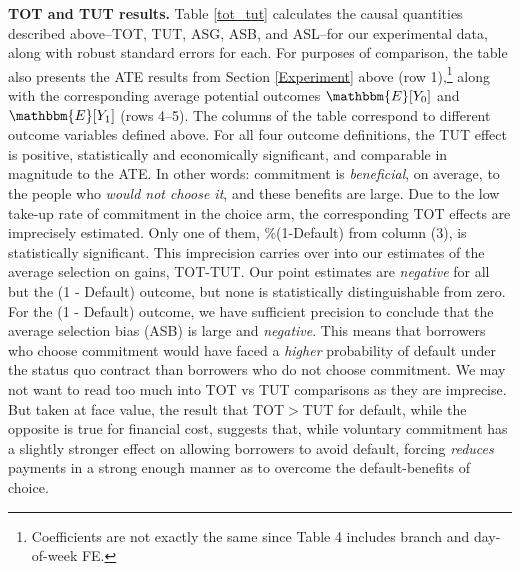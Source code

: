 \documentclass[11pt, a4paper]{article}
\begin{document}
\vspace{.2in}
\noindent \textbf{TOT and TUT results.} Table \ref{tot_tut} calculates the causal quantities described above--TOT, TUT, ASG, ASB, and ASL--for our experimental data, along with robust standard errors for each. 
For purposes of comparison, the table also presents the ATE results from Section \ref{Experiment} above (row 1),\footnote{Coefficients are not exactly the same since Table 4 includes branch and day-of-week FE.} along with the corresponding average potential outcomes $\mathbbm{E}[Y_0]$ and $\mathbbm{E}[Y_1]$ (rows 4--5).
The columns of the table correspond to different outcome variables defined above.
For all four outcome definitions, the TUT effect is positive, statistically and economically significant, and comparable in magnitude to the ATE.
In other words: commitment is \emph{beneficial}, on average, to the people who \emph{would not choose it}, and these benefits are large.
Due to the low take-up rate of commitment in the choice arm, the corresponding TOT effects are imprecisely estimated. Only one of them, \%(1-Default) from column (3), is statistically significant. 
This imprecision carries over into our estimates of the average selection on gains, TOT-TUT. Our point estimates are \emph{negative} for all but the (1 - Default) outcome, but none is statistically distinguishable from zero.  
For the (1 - Default) outcome, we have sufficient precision to conclude that the average selection bias (ASB) is large and \emph{negative}.
This means that borrowers who choose commitment would have faced a \emph{higher} probability of default under the status quo contract than borrowers who do not choose commitment.  We may not want to read too much into TOT vs TUT comparisons as they are imprecise. But taken at face value, the result that TOT$>$TUT for default, while the opposite is true for financial cost, suggests that, while voluntary commitment has a slightly stronger effect on allowing borrowers to avoid default, forcing \textit{reduces} payments in a strong enough manner as to overcome the default-benefits of choice.  
\end{document}
